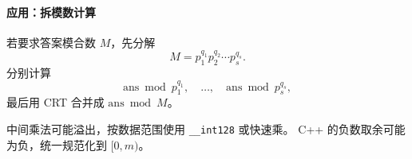 \paragraph{应用：拆模数计算}

若要求答案模合数 $M$，先分解
\[
  M=p_1^{q_1}p_2^{q_2}\cdots p_s^{q_s}.
\]
分别计算
\[
  \mathrm{ans}\bmod p_1^{q_1},
  \quad\ldots,\quad
  \mathrm{ans}\bmod p_s^{q_s},
\]
最后用 CRT 合并成 $\mathrm{ans}\bmod M$。

\begin{icpcwarning}[实现细节]
  中间乘法可能溢出，按数据范围使用 \texttt{\_\_int128} 或快速乘。
  C++ 的负数取余可能为负，统一规范化到 $[0,m)$。
\end{icpcwarning}
